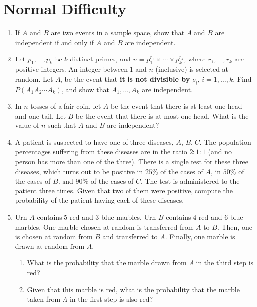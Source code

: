 \documentclass[svgnames]{amsart}
\begin{document}
\section{Normal Difficulty}
\begin{enumerate}[leftmargin=*]
\item If $A$ and $B$ are two events in a sample space, show that $A$ and $B$ are independent if and only if $A$ and $\overline B$ are independent.

\item Let $p_1, \ldots, p_k$ be $k$ distinct primes, and $n = p_1^{r_1} \times \cdots \times p_k^{r_k}$, where $r_1, \ldots, r_k$ are positive integers. An integer between $1$ and $n$ (inclusive) is selected at random. Let $A_i$ be the event that \textbf{it is not divisible by $p_i$}, $i = 1, \ldots, k$. Find $P(A_1 A_2 \cdots A_k)$, and show that $A_1, \ldots, A_k$ are independent.

\item In $n$ tosses of a fair coin, let $A$ be the event that there is at least one head and one tail. Let $B$ be the event that there is at most one head. What is the value of $n$ such that $A$ and $B$ are independent?

\item A patient is suspected to have one of three diseases, $A$, $B$, $C$. The population percentages suffering from these diseases are in the ratio $2:1:1$ (and no person has more than one of the three). There is a single test for these three diseases, which turns out to be positive in $25\%$ of the cases of $A$, in $50\%$ of the cases of $B$, and $90\%$ of the cases of $C$. The test is administered to the patient three times. Given that two of them were positive, compute the probability of the patient having each of these diseases.

\item Urn $A$ contains $5$ red and $3$ blue marbles. Urn $B$ contains $4$ red and $6$ blue marbles. One marble chosen at random is transferred from $A$ to $B$. Then, one is chosen at random from $B$ and transferred to $A$. Finally, one marble is drawn at random from $A$.
\begin{enumerate}
	\item What is the probability that the marble drawn from $A$ in the third step is red?
	\item Given that this marble is red, what is the probability that the marble taken from $A$ in the first step is also red?
\end{enumerate}
\end{enumerate} %
\end{document}
